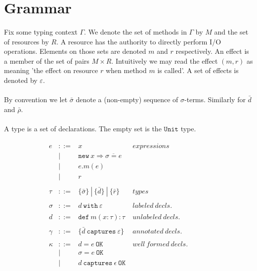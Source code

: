 \documentclass{llncs}
\newcommand{\keywadj}[1]{\mathtt{#1}}
\newcommand{\keyw}[1]{\keywadj{#1}~}
\begin{document}
\section{Grammar}


\paragraph{}
Fix some typing context $\Gamma$. We denote the set of methods in $\Gamma$ by $M$ and the set of resources by $R$. A resource has the authority to directly perform I/O operations. Elements on those sets are denoted $m$ and $r$ respectively. An effect is a member of the set of pairs $M \times R$. Intuitively we may read the effect $(m,r)$ as meaning 'the effect on resource $r$ when method $m$ is called'. A set of effects is denoted by $\varepsilon$.

\paragraph{}
By convention we let $\bar \sigma$ denote a (non-empty) sequence of $\sigma$-terms. Similarly for $\bar d$ and $\bar \rho$.

\paragraph{}
A type is a set of declarations. The empty set is the $\keywadj{Unit}$ type.

\[
\begin{array}{lll}

\begin{array}{lllr}
e & ::= & x & expressions \\
  & | & \keywadj{new}~x \Rightarrow \overline{\sigma = e} \\
  & | & e.m(e)\\
  & | & r \\
&&\\

\tau & ::= & \{ \bar \sigma \} ~ | ~ \{ \bar d \} ~ | ~ \{ \bar r \} & types \\
&&\\


\sigma & ::= & d~\keyw{with}\varepsilon  & labeled~ decls.\\
&&\\

d & ::= & \keyw{def} m(x:\tau):\tau & unlabeled~decls.\\
&&\\

\gamma & ::= & \{ \bar d~\keyw{captures} \varepsilon \} & annotated~decls.\\
&&\\

\kappa & ::= & d = e~\keyw{OK} & well~formed~decls. \\
 & | & \sigma = e~\keyw{OK}\\
 & | & d~\keyw{captures} \epsilon~\keyw{OK}\\

  
\end{array}
& ~~~~~~
&
\end{array}
\]
\end{document}
